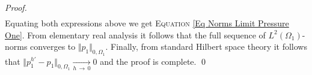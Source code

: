 \documentclass[3p]{elsarticle}
\def\div{\bm{\nabla} \cdot}
\def\Hdiv{\mathbf{H_{div}}}
\def\wone{\mathbf{w}_{1}}
\def\vone{\mathbf{v}_{1}}
\def\pone{p_{1}}
\def\poneh{p_{1}^{h}}
\def\ponehp{p_{1}^{h'}}
\begin{document}
\begin{proof}
\begin{equation*}
\begin{split}
\end{split}
\end{equation*}
%
Equating both expressions above we get \textsc{Equation} \ref{Eq Norms Limit Pressure One}. From elementary real analysis it follows that the full sequence of $L^{2}(\Omega_{1}) $-norms converges to $ \Vert \pone \Vert_{0, \Omega_{1}} $. Finally, from standard Hilbert space theory it follows that $ \Vert \ponehp -  \pone\Vert_{0, \Omega_{1}} \xrightarrow[h\,\rightarrow\, 0]{} 0 $ 
and the proof is complete.
%
\qed
\end{proof}
%
%
%
%
%
%
%
%
%
%
%
%
%
\end{document}
